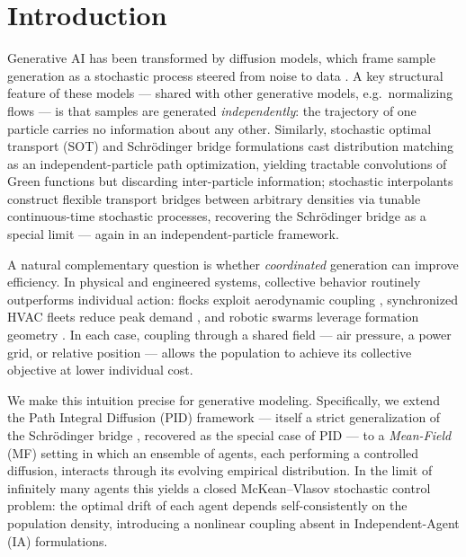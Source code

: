\documentclass[11pt,onecolumn]{article}
\begin{document}
\section*{Introduction}
\label{sec:intro}

Generative AI has been transformed by diffusion models, which frame sample generation as a stochastic process steered from noise to data \cite{sohl-dickstein_deep_2015,ho_denoising_2020,song_score-based_2021}. A key structural feature of these models --- shared with other generative models, e.g.\ normalizing flows \cite{rezende_variational_2015,papamakarios_normalizing_2021} --- is that samples are generated \emph{independently}: the trajectory of one particle carries no information about any other. Similarly, stochastic optimal transport (SOT) and Schr\"odinger bridge formulations \cite{pavon_free_1991,leonard_survey_2013,chen_optimal_2017} cast distribution matching as an independent-particle path optimization, yielding tractable convolutions of Green functions but discarding inter-particle information; stochastic interpolants \cite{albergo_building_2023} construct flexible transport bridges between arbitrary densities via tunable continuous-time stochastic processes, recovering the Schrödinger bridge as a special limit --- again in an independent-particle framework.

A natural complementary question is whether \emph{coordinated} generation can improve efficiency. In physical and engineered systems, collective behavior routinely outperforms individual action: flocks exploit aerodynamic coupling \cite{brambati_learning_2026}, synchronized HVAC fleets reduce peak demand \cite{callaway_tapping_2009,callaway_achieving_2011,mathieu_arbitraging_2015,beil_frequency_2016}, and robotic swarms leverage formation geometry \cite{borra_optimal_2021,kachar_dynamic_2019}. In each case, coupling through a shared field --- air pressure, a power grid, or relative position --- allows the population to achieve its collective objective at lower individual cost.

We make this intuition precise for generative modeling. Specifically, we extend the Path Integral Diffusion (PID) framework \cite{behjoo_harmonic_2025,chertkov_adaptive_2025,chertkov_generative_2025} --- itself a strict generalization of the Schr\"odinger bridge \cite{pavon_free_1991,leonard_survey_2013, chen_optimal_2017,caluya_reflected_2020,teter_contraction_2023}, recovered as the special case of PID --- to a \emph{Mean-Field} (MF) setting in which an ensemble of agents, each performing a controlled diffusion, interacts through its evolving empirical distribution. In the limit of infinitely many agents this yields a closed McKean--Vlasov stochastic control problem: the optimal drift of each agent depends self-consistently on the population density, introducing a nonlinear coupling absent in Independent-Agent (IA) formulations.
\end{document}
